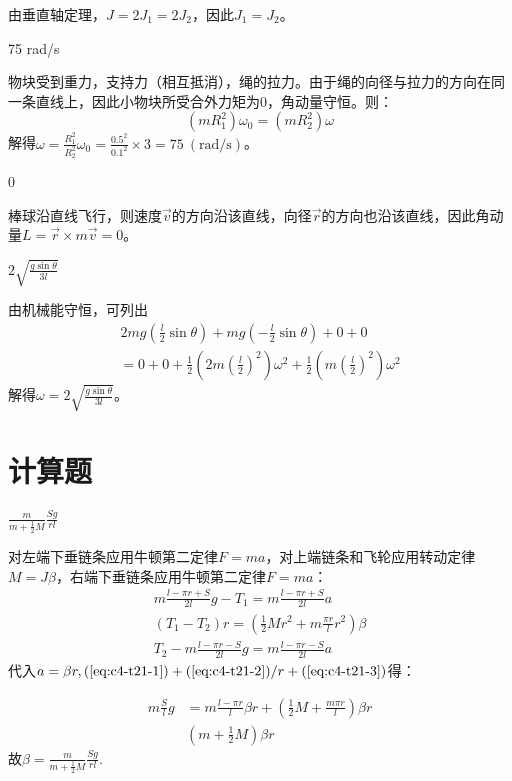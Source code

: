 \documentclass[b5paper,opensource,sourcefont,parskip]{qyxf-book}
\begin{document}
由垂直轴定理，$ J=2J_1=2J_2 $，因此$ J_1=J_2 $。

75 rad/s

\solve 物块受到重力，支持力（相互抵消），绳的拉力。由于绳的向径与拉力的方向在同一条直线上，因此小物块所受合外力矩为0，角动量守恒。则：
\[(mR_1^2)\omega_0=(mR_2^2)\omega\]
解得$\omega=\frac{R_1^2}{R_2^2}\omega_0=\frac{0.5^2}{0.1^2}\times 3=75\ (\mathrm{rad/s})$。

0

\solve 棒球沿直线飞行，则速度$ \vec{v} $的方向沿该直线，向径$ \vec{r} $的方向也沿该直线，因此角动量$ L=\vec{r}\times m\vec{v}=0 $。

$2\sqrt{\frac{g\sin\theta}{3l}}$

\solve 由机械能守恒，可列出
\begin{gather*}
\hspace{1pt}2mg\left(\frac{l}{2}\sin\theta\right)+mg\left(-\frac{l}{2}\sin\theta\right)+0+0\\
=0+0+\frac{1}{2}\left(2m\left(\frac{l}{2}\right)^2\right)\omega^2+\frac{1}{2}\left(m\left(\frac{l}{2}\right)^2\right)\omega^2
\end{gather*}
解得$\omega=2\sqrt{\frac{g\sin\theta}{3l}}$。

\section{计算题}

$\frac{m}{m+\frac{1}{2}M}\frac{Sg}{rl}$
			
\solve 对左端下垂链条应用牛顿第二定律$F=ma$，对上端链条和飞轮应用转动定律$M=J\beta$，右端下垂链条应用牛顿第二定律$F=ma$：
\begin{gather}
m\frac{l-\pi r+S}{2l}g-T_1=m\frac{l-\pi r+S}{2l}a\label{eq:c4-t21-1}\\
(T_1-T_2)r=\left(\frac{1}{2}Mr^2+m\frac{\pi r}{l}r^2\right)\beta\label{eq:c4-t21-2}\\
T_2-m\frac{l-\pi r-S}{2l}g=m\frac{l-\pi r-S}{2l}a\label{eq:c4-t21-3}
\end{gather}
代入$a=\beta r,(\ref{eq:c4-t21-1})+(\ref{eq:c4-t21-2})/r+(\ref{eq:c4-t21-3})$得：

\begin{align*}
m\frac{S}{l}g&=m\frac{l-\pi r}{l}\beta r+\left(\frac{1}{2}M+\frac{m\pi r}{l}\right)\beta r\\
&\left(m+\frac{1}{2}M\right)\beta r
\end{align*}
故$\beta=\frac{m}{m+\frac{1}{2}M}\frac{Sg}{rl}$.
\end{document}
